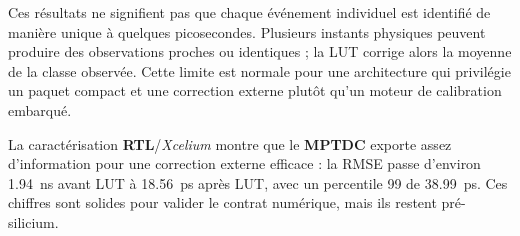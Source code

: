 Ces résultats ne signifient pas que chaque événement individuel est identifié de manière unique à quelques picosecondes. Plusieurs instants physiques peuvent produire des observations proches ou identiques ; la LUT corrige alors la moyenne de la classe observée. Cette limite est normale pour une architecture qui privilégie un paquet compact et une correction externe plutôt qu'un moteur de calibration embarqué.

\begin{summaryBox}
La caractérisation \textbf{RTL}/\textit{Xcelium} montre que le \textbf{MPTDC} exporte assez d'information pour une correction externe efficace : la RMSE passe d'environ \SI{1.94}{\nano\second} avant LUT à \SI{18.56}{\pico\second} après LUT, avec un percentile 99 de \SI{38.99}{\pico\second}. Ces chiffres sont solides pour valider le contrat numérique, mais ils restent pré-silicium.
\end{summaryBox}

\clearpage
